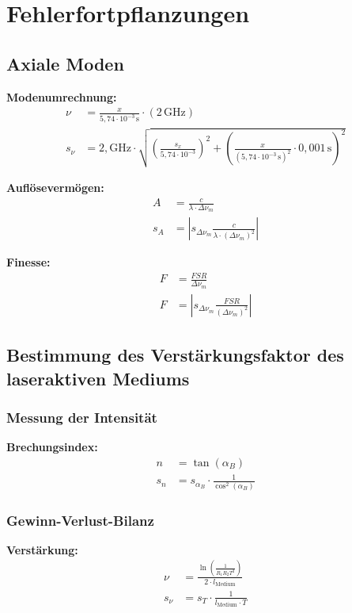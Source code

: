 \chapter{Fehlerfortpflanzungen}
\section{Axiale Moden}
\textbf{Modenumrechnung:}
\begin{align}
    \nu&=\frac{x}{5,74\cdot10^{-3}\,\text{s}}\cdot\left(2\,\text{GHz}\right)\\
    s_\nu&=2,\text{GHz}\cdot\sqrt{\left(\frac{s_x}{5,74\cdot10^{-3}}\right)^2+\left(\frac{x}{\left(5,74\cdot10^{-3}\,\text{s}\right)^2}\cdot0,001\,\text{s}\right)^2}
\end{align}

\textbf{Auflösevermögen:}
\begin{align}
    A&=\frac{c}{\lambda\cdot\Delta\nu_m}\\
    s_A&=\left|s_{\Delta\nu_m}\frac{c}{\lambda\cdot\left(\Delta\nu_m\right)^2}\right|
\end{align}

\textbf{Finesse:}
\begin{align}
    F&=\frac{FSR}{\Delta\nu_m}\\
    F&=\left|s_{\Delta\nu_m}\frac{FSR}{\left(\Delta\nu_m\right)^2}\right|
\end{align}
\section{Bestimmung des Verstärkungsfaktor des laseraktiven Mediums}
\subsection{Messung der Intensität}
\textbf{Brechungsindex:}
\begin{align}
    n&=\tan\left(\alpha_B\right)\\
    s_n&=s_{\alpha_B}\cdot\frac{1}{\cos^2(\alpha_B)}
\end{align}
\subsection{Gewinn-Verlust-Bilanz}
\textbf{Verstärkung:}
\begin{align}
    \nu&=\frac{\ln\left(\frac{1}{R_1R_2T^2}\right)}{2\cdot l_\text{Medium}}\\
    s_\nu&=s_T\cdot\frac{1}{l_\text{Medium}\cdot T}
\end{align}

